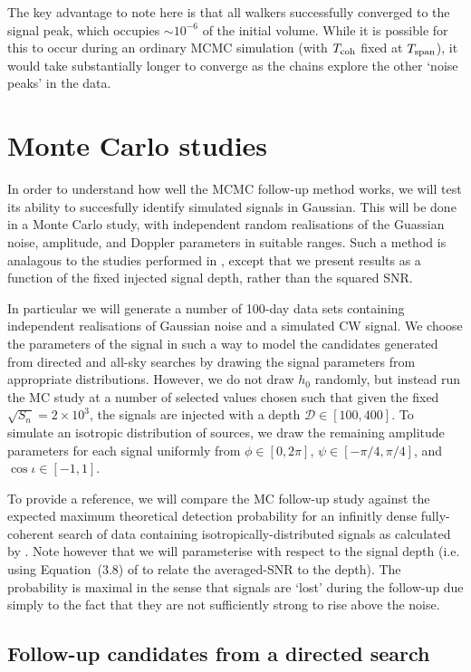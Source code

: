 \documentclass[aps, prd, twocolumn, superscriptaddress, floatfix, showpacs, nofootinbib, longbibliography]{revtex4-1}
\begin{document}
The key advantage to note here is that all walkers successfully converged to the
signal peak, which occupies $\sim 10^{-6}$ of the initial volume. While it is
possible for this to occur during an ordinary MCMC simulation (with $T_{\rm coh}$
fixed at $T_{\rm span}$), it would take substantially longer to converge as the
chains explore the other `noise peaks' in the data.

\section{Monte Carlo studies}

In order to understand how well the MCMC follow-up method works, we will test
its ability to succesfully identify simulated signals in Gaussian. This will be
done in a Monte Carlo study, with independent random realisations of the
Guassian noise, amplitude, and Doppler parameters in suitable ranges. Such a
method is analagous to the studies performed in \citet{shaltev2013}, except
that we present results as a function of the fixed injected signal depth,
rather than the squared SNR.

In particular we will generate a number of 100-day data sets containing
independent realisations of Gaussian noise and a simulated CW signal. We choose
the parameters of the signal in such a way to model the candidates generated
from directed and all-sky searches by drawing the signal parameters from
appropriate distributions. However, we do not draw $h_0$ randomly, but instead
run the MC study at a number of selected values chosen such that given the
fixed $\sqrt{S_n}=2\times10^{3}$, the signals are injected with a depth
$\mathcal{D} \in [100, 400]$.  To simulate an isotropic distribution of
sources, we draw the remaining amplitude parameters for each signal uniformly
from $\phi \in [0, 2\pi]$, $\psi \in [-\pi/4, \pi/4]$, and $\cos\iota \in [-1,
1]$.

To provide a reference, we will compare the MC follow-up study against the
expected maximum theoretical detection probability for an infinitly dense
fully-coherent search of data containing isotropically-distributed signals as
calculated by \citet{wette2012}. Note however that we will parameterise with
respect to the signal depth (i.e. using Equation~(3.8) of \citet{wette2012} to
relate the averaged-SNR to the depth). The probability is maximal in the
sense that signals are `lost' during the follow-up due simply to the fact that
they are not sufficiently strong to rise above the noise.


\subsection{Follow-up candidates from a directed search}
\label{sec_directed_follow_up}
\end{document}
